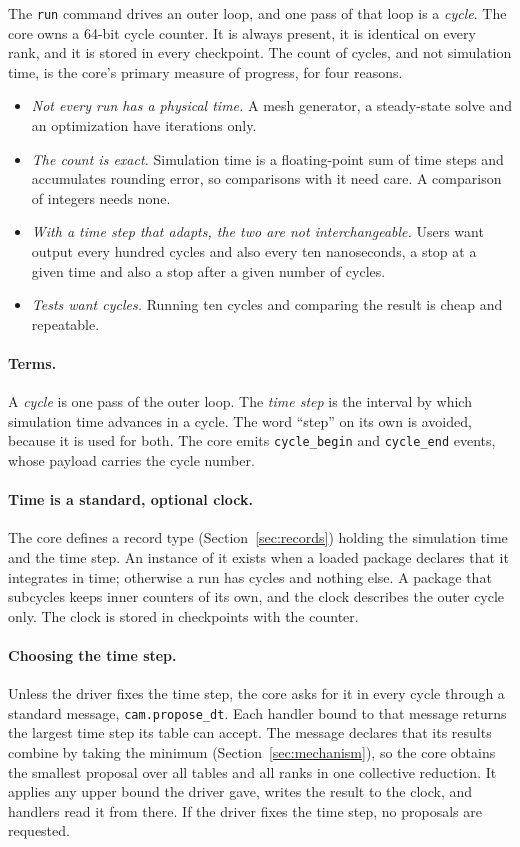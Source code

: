 \documentclass[11pt,a4paper]{article}
\newcommand{\code}[1]{\texttt{#1}}
\begin{document}
The \code{run} command drives an outer loop, and one pass of that loop is a
\emph{cycle}.  The core owns a 64-bit cycle counter.  It is always present,
it is identical on every rank, and it is stored in every checkpoint.  The
count of cycles, and not simulation time, is the core's primary measure of
progress, for four reasons.

\begin{itemize}
  \item \emph{Not every run has a physical time.}  A mesh generator, a
        steady-state solve and an optimization have iterations only.
  \item \emph{The count is exact.}  Simulation time is a floating-point sum
        of time steps and accumulates rounding error, so comparisons with it
        need care.  A comparison of integers needs none.
  \item \emph{With a time step that adapts, the two are not
        interchangeable.}  Users want output every hundred cycles and also
        every ten nanoseconds, a stop at a given time and also a stop after
        a given number of cycles.
  \item \emph{Tests want cycles.}  Running ten cycles and comparing the
        result is cheap and repeatable.
\end{itemize}

\paragraph{Terms.}  A \emph{cycle} is one pass of the outer loop.  The
\emph{time step} is the interval by which simulation time advances in a
cycle.  The word \enquote{step} on its own is avoided, because it is used
for both.  The core emits \code{cycle\_begin} and \code{cycle\_end} events,
whose payload carries the cycle number.

\paragraph{Time is a standard, optional clock.}  The core defines a record
type (Section~\ref{sec:records}) holding the simulation time and the time
step.  An instance of it exists when a loaded package declares that it
integrates in time; otherwise a run has cycles and nothing else.  A package
that subcycles keeps inner counters of its own, and the clock describes the
outer cycle only.  The clock is stored in checkpoints with the counter.

\paragraph{Choosing the time step.}  Unless the driver fixes the time step,
the core asks for it in every cycle through a standard message,
\code{cam.propose\_dt}.  Each handler bound to that message returns the
largest time step its table can accept.  The message declares that its
results combine by taking the minimum (Section~\ref{sec:mechanism}), so the
core obtains the smallest proposal over all tables and all ranks in one
collective reduction.  It applies any upper bound the driver gave, writes
the result to the clock, and handlers read it from there.  If the driver
fixes the time step, no proposals are requested.
\end{document}

